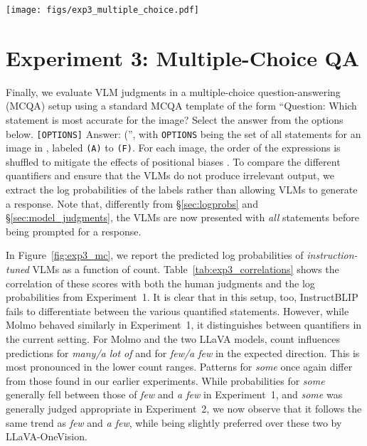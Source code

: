 \begin{figure*}[t]
    \centering
    \texttt{[image: figs/exp3\_multiple\_choice.pdf]}
    \caption{\textbf{Log probabilities extracted for multiple-choice labels in Experiment~3.} We do not display results for BLIP-2 because that model is not instruction-tuned.}\label{fig:exp3_mc}
\end{figure*}

\section{Experiment 3: Multiple-Choice QA}
Finally, we evaluate VLM judgments in a multiple-choice question-answering (MCQA) setup using a standard MCQA template of the form 
``Question: Which statement is most accurate for the image? Select the answer from the options below. \verb|[OPTIONS]| Answer: ('', 
with \verb|OPTIONS| being the set of all statements for an image in \dataset, labeled \verb|(A)| to \verb|(F)|. 
For each image, the order of the expressions is shuffled to mitigate the effects of positional biases \cite{zong_fool_2024}.
To compare the different quantifiers and ensure that the VLMs do not produce irrelevant output, we extract the log probabilities of the labels rather than allowing VLMs to generate a response.
Note that, differently from \S\ref{sec:logprobs} and \S\ref{sec:model_judgments}, the VLMs are now presented with {\em all} statements before being prompted for a response. 

In Figure~\ref{fig:exp3_mc}, we report the predicted log probabilities of \emph{instruction-tuned} VLMs as a function of count.
Table~\ref{tab:exp3_correlations} shows the correlation of these scores with both the human judgments and the log probabilities from Experiment~1.
It is clear that in this setup, too, InstructBLIP fails to differentiate between the various quantified statements. 
However, while Molmo behaved similarly in Experiment~1, it distinguishes between quantifiers in the current setting.
For Molmo and the two LLaVA models, count influences predictions for \textit{many/a lot of} and for \textit{few/a few} in the expected direction. 
This is most pronounced in the lower count ranges. 
Patterns for \textit{some} once again differ from those found in our earlier experiments. While probabilities for {\em some} generally fell between those of \textit{few} and \textit{a few} in Experiment~1, and {\em some} was generally judged appropriate in Experiment~2, we now observe that it follows the same trend as \textit{few} and \textit{a few}, while being slightly preferred over these two by LLaVA-OneVision.

